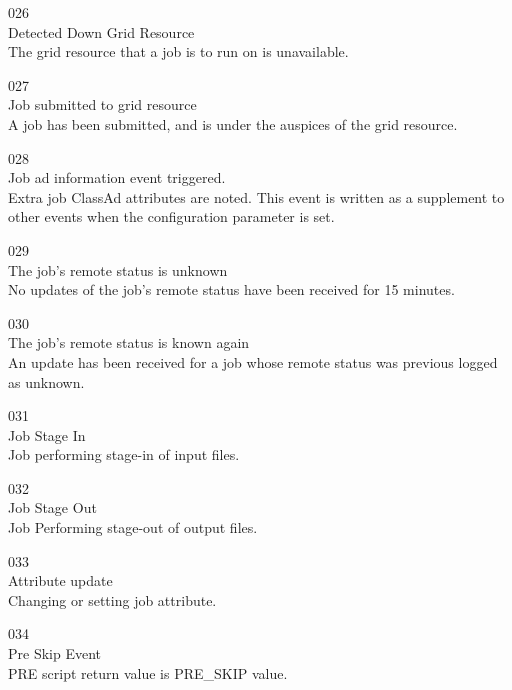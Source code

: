 \noindent{} 026 \\
 Detected Down Grid Resource \\
 The grid resource that a job is to
run on is unavailable.

\noindent{} 027 \\
 Job submitted to grid resource \\
 A job has been submitted,
and is under the auspices of the grid resource.

\noindent{} 028 \\
 Job ad information event triggered. \\
 Extra job ClassAd attributes are noted. This event is
written as a supplement to other events when the configuration
parameter  is set.

\noindent{} 029 \\
 The job's remote status is unknown \\
 No updates of the job's remote status
have been received for 15 minutes.

\noindent{} 030 \\
 The job's remote status is known again \\
 An update has been received for a job whose
remote status was previous logged as unknown.

\noindent{} 031 \\
 Job Stage In \\
 Job performing stage-in of input files.

\noindent{} 032 \\
 Job Stage Out \\
 Job Performing stage-out of output files.

\noindent{} 033 \\
 Attribute update \\
 Changing or setting job attribute.

\noindent{} 034 \\
 Pre Skip Event \\
 PRE script return value is PRE\_SKIP value.

